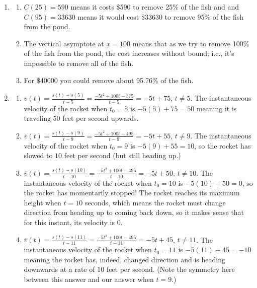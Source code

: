 \begin{enumerate}
\setcounter{enumi}{\value{HW}}


\item \begin{enumerate}

\item $C(25) = 590$ means it costs \$590 to remove 25\% of the fish and and $C(95)= 33630$ means it would cost \$33630 to remove 95\% of the fish from the pond.
\item The vertical asymptote at $x = 100$ means that as we try to remove 100\% of the fish from the pond, the cost increases without bound; i.e., it's impossible to remove all of the fish.  
\item For \$40000 you could remove about 95.76\% of the fish.

\end{enumerate}

\item  \begin{enumerate}

\item  $\overline{v}(t) = \frac{s(t) - s(5)}{t - 5} = \frac{-5t^2+100t-375}{t-5} = -5t+75$, $t \neq 5$.  The instantaneous velocity of the rocket when $t_{0} = 5$ is $-5(5)+75 = 50$ meaning it is traveling $50$ feet per second upwards.

\item  $\overline{v}(t) = \frac{s(t) - s(9)}{t - 9} = \frac{-5t^2+100t-495}{t-9} = -5t+55$, $t \neq 9$.  The instantaneous velocity of the rocket when $t_{0} = 9$ is $-5(9)+55 = 10$, so the rocket has slowed to $10$ feet per second (but still heading up.)

\item $\overline{v}(t) = \frac{s(t) - s(10)}{t - 10} = \frac{-5t^2+100t-495}{t-10} = -5t+50$, $t \neq 10$.  The instantaneous velocity of the rocket when $t_{0} = 10$ is $-5(10)+50 = 0$, so the rocket has momentarily stopped!  The rocket reaches its maximum height when $t = 10$ seconds, which means the rocket must change direction from heading up to coming back down, so it makes sense that for this instant, its velocity is $0$.

\item  $\overline{v}(t) = \frac{s(t) - s(11)}{t - 11} = \frac{-5t^2+100t-495}{t-11} = -5t+45$, $t \neq 11$.  The instantaneous velocity of the rocket when $t_{0} = 11$ is $-5(11)+45 = -10$ meaning the rocket has, indeed, changed direction and is heading downwards at a rate of $10$ feet per second.  (Note the symmetry here between this answer and our answer when $t=9$.)


\end{enumerate}
\end{enumerate}
